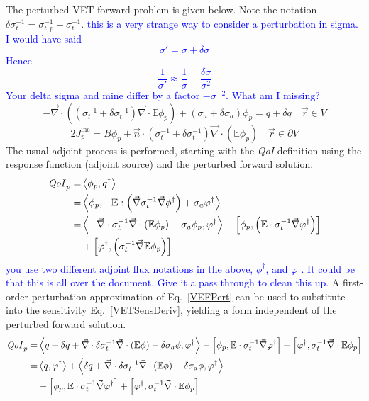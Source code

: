 \documentclass[12pt]{report}
\newcommand{\vr}{\vec{r}}
\newcommand{\bra}{\left\langle}
\newcommand{\ket}{\right\rangle}
\newcommand{\sbra}{\left[}
\newcommand{\sket}{\right]}
\renewcommand{\div}{\vec{\nabla} \cdot}
\newcommand{\grad}{\vec{\nabla}}
\newcommand{\vefadj}{\varphi^\dag}
\newcommand{\domain}{V}
\newcommand{\bound}{\partial V}
\newcommand{\vn}{\vec{n}}
\newcommand{\Edd}{\mathbb{E}}
\newcommand{\siga}{\sigma_a}
\newcommand{\isigt}{\sigma_t^{-1}}
\newcommand{\isigtp}{\sigma_{t,p}^{-1}}
\newcommand{\scalSource}{q}
\newcommand{\scalResp}{q^\dag}
\newcommand{\qoi}{{\it QoI}\xspace}
\newcommand{\comment}[2]{\marginpar{\textcolor{#2}{$\star$}}\textcolor{#2}{#1}\newline}
\newcommand{\jcr}[1]{\comment{#1}{blue}}
\newcommand{\jcr}[1]{\phantom{a}}
\begin{document}
The perturbed VET forward problem is given below. Note the notation $\delta \isigt = \isigtp - \isigt$.
\jcr{this is a very strange way to consider a perturbation in sigma. I would have said
\[ 
\sigma' =\sigma + \delta \sigma
\]
Hence
\[ 
\frac{1}{\sigma'} \approx \frac{1}{\sigma} - \frac{\delta\sigma}{\sigma^2}
\]
Your delta sigma and mine differ by a factor $-\sigma^{-2}$. What am I missing?
}
\begin{subequations}
\begin{equation}
\label{VEFPert}
- \div \left((\isigt + \delta \isigt)\div \Edd \phi_p \right) + (\siga + \delta \siga)\phi_p = \scalSource + \delta \scalSource  \quad \vr \in \domain
\end{equation}
\end{subequations}
\begin{subequations}
\begin{equation}
 2J_p^\text{inc} = B \phi_p  + \vn \cdot  (\isigt + \delta \isigt) \vec{\nabla} \cdot \left(\Edd \phi_p \right)  \quad \vr \in \bound
\end{equation}
\end{subequations}
The usual adjoint process is performed, starting with the \qoi definition using the response function (adjoint source) and the perturbed forward solution. 
\begin{equation}
\label{VETSensDeriv}
\begin{split}
\qoi_p = &\bra \phi_p , \scalResp \ket \\
       = &\bra \phi_p , - \Edd : \left( \grad \isigt \grad \phi^\dag \right) + \siga \vefadj \ket \\
       = & \bra - \div \isigt \div \left( \Edd \phi_p \right) + \siga \phi_p, \vefadj \ket 
 - \sbra \phi_p , \left( \Edd \cdot \isigt \grad \vefadj\right) \sket  \\ 
&+ \sbra \vefadj , \left(  \isigt \grad \Edd \phi_p \right) \sket \\
\end{split}
\end{equation}
\jcr{you use two different adjoint flux notations in the above, $\phi^\dag$, and $\vefadj $. It could be that this is all over the document. Give it a pass through to clean this up.}
A first-order perturbation approximation of Eq.~\eqref{VEFPert} can be used to substitute into the sensitivity Eq.~\eqref{VETSensDeriv}, yielding a form independent of the perturbed forward solution.
\begin{equation}
\label{QoIVETAdjNoBC}
\begin{split}
\qoi_p =& \bra \scalSource + \delta \scalSource + \div \delta \isigt \div \left( \Edd \phi \right) - \delta \siga \phi, \vefadj \ket - \sbra \phi_p, \Edd \cdot \isigt \grad \vefadj \sket + \sbra \vefadj, \isigt \div \Edd \phi_p \sket \\
=& \bra q, \vefadj \ket  + \bra \delta \scalSource + \div \delta \isigt \div \left( \Edd \phi \right)  - \delta \siga \phi, \vefadj \ket \\
& - \sbra \phi_p, \Edd \cdot \isigt \grad \vefadj \sket + \sbra \vefadj, \isigt \div \Edd \phi_p \sket 
\end{split}
\end{equation}
\end{document}
